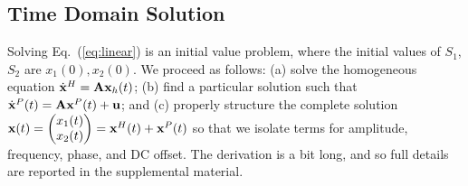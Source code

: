 \documentclass{bmcart}
\newcommand{\eqn}[1]{Eq.~(\ref{#1})}
\begin{document}

\subsection*{Time Domain Solution}
Solving \eqn{eq:linear} is an initial value problem, where the initial values
of $S_1$, $S_2$ are $x_1(0), x_2(0)$.
We proceed as follows:
(a) solve the homogeneous equation $\dot{\bf x}^H = {\bf A} {\bf x}_h(t)$; 
(b) find a particular solution such that  $\dot{{\bf x}}^P (t) = {\bf A} {\bf x}^P(t) + {\bf u}$; and (c) properly structure the complete solution ${\bf x}(t) = \begin{pmatrix} x_1 (t) \\ x_2(t) \end{pmatrix} = {\bf x}^H (t) + {\bf x}^P (t)$ so that we isolate terms for amplitude, frequency, phase, and DC offset. The derivation is a bit long, and so full details are reported in the supplemental material.
\end{document}
